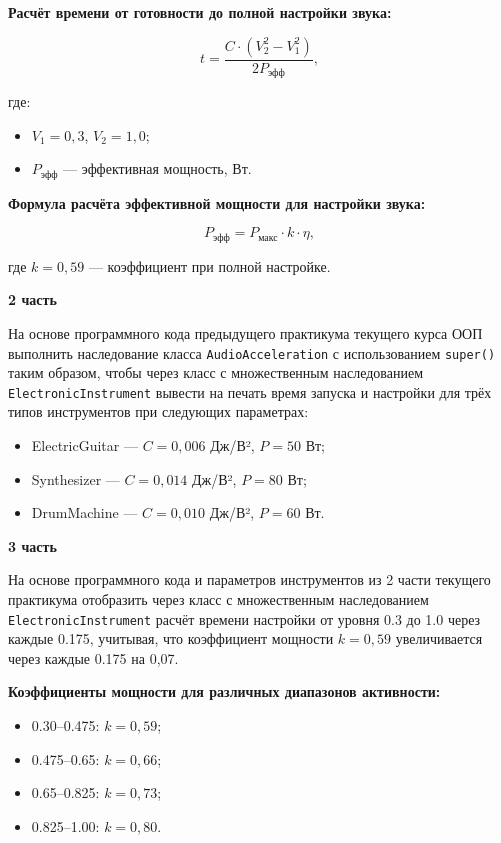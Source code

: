 \begin{enumerate}
\textbf{Расчёт времени от готовности до полной настройки звука:}

\begin{equation}
t = \frac{C \cdot (V_2^2 - V_1^2)}{2P_{\text{эфф}}},
\end{equation}

где:  
\begin{itemize}
    \item $V_1 = 0{,}3$, $V_2 = 1{,}0$;  
    \item $P_{\text{эфф}}$ — эффективная мощность, Вт.  
\end{itemize}

\textbf{Формула расчёта эффективной мощности для настройки звука:}

\begin{equation}
P_{\text{эфф}} = P_{\text{макс}} \cdot k \cdot \eta,
\end{equation}

где $k = 0{,}59$ — коэффициент при полной настройке.

\textbf{2 часть}

На основе программного кода предыдущего практикума текущего курса ООП выполнить наследование класса \texttt{AudioAcceleration} с использованием \texttt{super()} таким образом, чтобы через класс с множественным наследованием \texttt{ElectronicInstrument} вывести на печать время запуска и настройки для трёх типов инструментов при следующих параметрах:

\begin{itemize}
    \item ElectricGuitar — $C = 0{,}006$ Дж/В², $P = 50$ Вт;  
    \item Synthesizer — $C = 0{,}014$ Дж/В², $P = 80$ Вт;  
    \item DrumMachine — $C = 0{,}010$ Дж/В², $P = 60$ Вт.  
\end{itemize}

\textbf{3 часть}

На основе программного кода и параметров инструментов из 2 части текущего практикума отобразить через класс с множественным наследованием \texttt{ElectronicInstrument} расчёт времени настройки от уровня 0.3 до 1.0 через каждые 0.175, учитывая, что коэффициент мощности $k = 0{,}59$ увеличивается через каждые 0.175 на 0{,}07.

\textbf{Коэффициенты мощности для различных диапазонов активности:}
\begin{itemize}
    \item 0.30–0.475: $k = 0{,}59$;  
    \item 0.475–0.65: $k = 0{,}66$;  
    \item 0.65–0.825: $k = 0{,}73$;  
    \item 0.825–1.00: $k = 0{,}80$.  
\end{itemize}



\end{enumerate}
